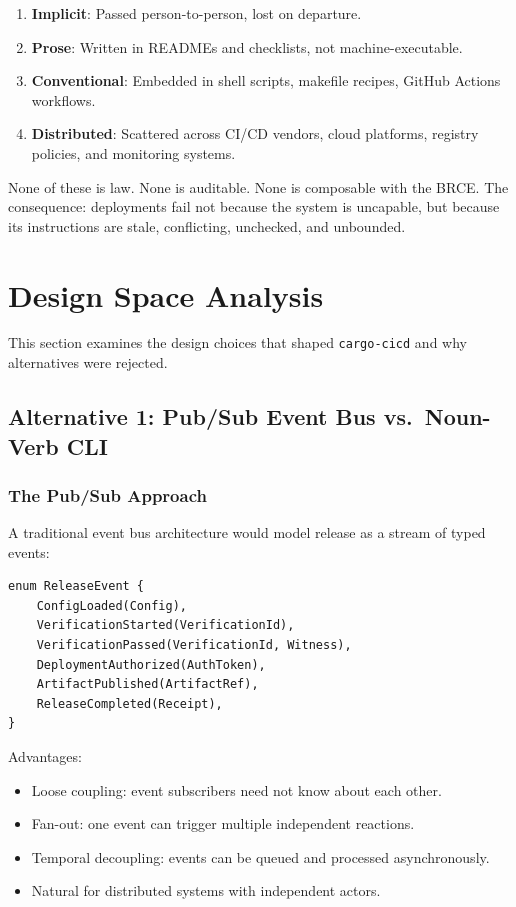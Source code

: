 \begin{enumerate}
  \item \textbf{Implicit}: Passed person-to-person, lost on departure.
  \item \textbf{Prose}: Written in READMEs and checklists, not machine-executable.
  \item \textbf{Conventional}: Embedded in shell scripts, makefile recipes, GitHub Actions workflows.
  \item \textbf{Distributed}: Scattered across CI/CD vendors, cloud platforms, registry policies, and monitoring systems.
\end{enumerate}

None of these is law. None is auditable. None is composable with the BRCE. The consequence: deployments fail not because the system is uncapable, but because its instructions are stale, conflicting, unchecked, and unbounded.

\section{Design Space Analysis}

This section examines the design choices that shaped \texttt{cargo-cicd} and why alternatives were rejected.

\subsection{Alternative 1: Pub/Sub Event Bus vs.\ Noun-Verb CLI}

\subsubsection{The Pub/Sub Approach}

A traditional event bus architecture would model release as a stream of typed events:

\begin{lstlisting}[caption={Pub/Sub event bus design pattern for release orchestration}]
enum ReleaseEvent {
    ConfigLoaded(Config),
    VerificationStarted(VerificationId),
    VerificationPassed(VerificationId, Witness),
    DeploymentAuthorized(AuthToken),
    ArtifactPublished(ArtifactRef),
    ReleaseCompleted(Receipt),
}
\end{lstlisting}

Advantages:
\begin{itemize}
  \item Loose coupling: event subscribers need not know about each other.
  \item Fan-out: one event can trigger multiple independent reactions.
  \item Temporal decoupling: events can be queued and processed asynchronously.
  \item Natural for distributed systems with independent actors.
\end{itemize}

